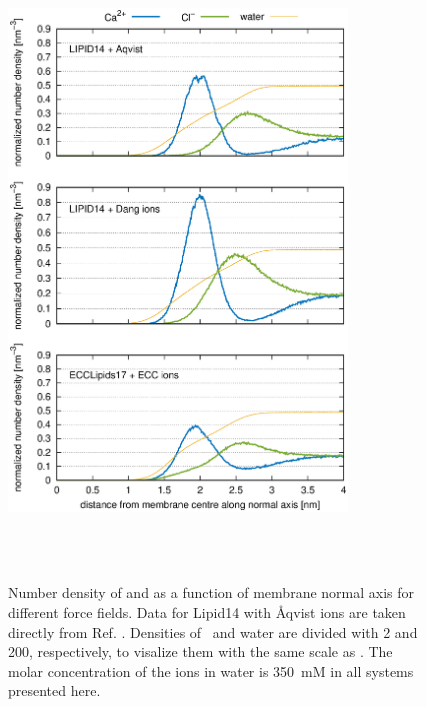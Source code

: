 \documentclass[aip,jcp,twocolumn]{revtex4}
\begin{document}




\begin{figure}[tbp]
  \centering
  \includegraphics[width=9.0cm,angle=0]{../Fig/CAdensities2.eps}
  \caption{\label{fig:cacl-dens}
    Number density of  and  as a function of membrane normal axis
    for different force fields. Data for Lipid14 with \AA{}qvist ions are taken directly from Ref. .
    Densities of~ and water are divided with 2 and 200, respectively, to visalize them
    with the same scale as . The molar concentration of the ions in water is 350~mM in all systems
    presented here. 
    }
   \\
   \\
\end{figure}
\end{document}
